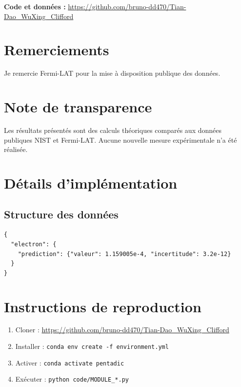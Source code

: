 \documentclass[11pt,a4paper]{article}
\theoremstyle{plain}
\theoremstyle{definition}
\theoremstyle{remark}
\begin{document}
\medskip
\noindent
\textbf{Code et données :} \url{https://github.com/bruno-dd470/Tian-Dao_WuXing_Clifford}

\section*{Remerciements}

Je remercie Fermi-LAT pour la mise à disposition publique des données.

\section*{Note de transparence}

Les résultats présentés sont des calculs théoriques comparés aux données publiques NIST et Fermi-LAT. Aucune nouvelle mesure expérimentale n'a été réalisée.

\printbibliography

\appendix
\section{Détails d'implémentation}

\subsection{Structure des données}

\begin{lstlisting}[caption={Structure JSON},label={lst:json}]
{
  "electron": {
    "prediction": {"valeur": 1.159005e-4, "incertitude": 3.2e-12}
  }
}
\end{lstlisting}

\section{Instructions de reproduction}

\begin{enumerate}
  \item Cloner : \url{https://github.com/bruno-dd470/Tian-Dao_WuXing_Clifford}
  \item Installer : \texttt{conda env create -f environment.yml}
  \item Activer : \texttt{conda activate pentadic}
  \item Exécuter : \texttt{python code/MODULE_*.py}
\end{enumerate}
\end{document}
